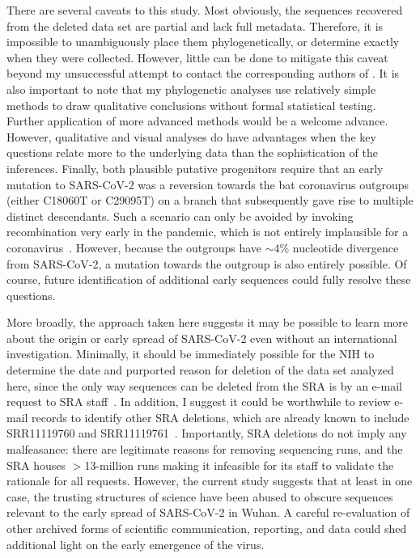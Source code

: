 \documentclass[9pt,twocolumn,twoside]{gsajnl_modified}
\begin{document}
There are several caveats to this study.
Most obviously, the sequences recovered from the deleted data set are partial and lack full metadata.
Therefore, it is impossible to unambiguously place them phylogenetically, or determine exactly when they were collected.
However, little can be done to mitigate this caveat beyond my unsuccessful attempt to contact the corresponding authors of \citet{wang2020medRxiv}.
It is also important to note that my phylogenetic analyses use relatively simple methods to draw qualitative conclusions without formal statistical testing.
Further application of more advanced methods would be a welcome advance.
However, qualitative and visual analyses do have advantages when the key questions relate more to the underlying data than the sophistication of the inferences.
Finally, both plausible putative progenitors require that an early mutation to SARS-CoV-2 was a reversion towards the bat coronavirus outgroups (either C18060T or C29095T) on a branch that subsequently gave rise to multiple distinct descendants.
Such a scenario can only be avoided by invoking recombination very early in the pandemic, which is not entirely implausible for a coronavirus~\citep{boni2020evolutionary}.
However, because the outgroups have $\sim$4\% nucleotide divergence from SARS-CoV-2, a mutation towards the outgroup is also entirely possible.
Of course, future identification of additional early sequences could fully resolve these questions.

More broadly, the approach taken here suggests it may be possible to learn more about the origin or early spread of SARS-CoV-2 even without an international investigation.
Minimally, it should be immediately possible for the NIH to determine the date and purported reason for deletion of the data set analyzed here, since the only way sequences can be deleted from the SRA is by an e-mail request to SRA staff~\citep{SRA_deletion}.
In addition, I suggest it could be worthwhile to review e-mail records to identify other SRA deletions, which are already known to include SRR11119760 and SRR11119761~\citep{USRTK2020}.
Importantly, SRA deletions do not imply any malfeasance: there are legitimate reasons for removing sequencing runs, and the SRA houses $>$13-million runs making it infeasible for its staff to validate the rationale for all requests.
However, the current study suggests that at least in one case, the trusting structures of science have been abused to obscure sequences relevant to the early spread of SARS-CoV-2 in Wuhan.
A careful re-evaluation of other archived forms of scientific communication, reporting, and data could shed additional light on the early emergence of the virus.
\end{document}
